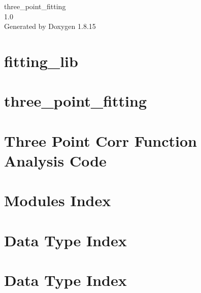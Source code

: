\let\mypdfximage\pdfximage\def\pdfximage{\immediate\mypdfximage}\documentclass[twoside]{book}
\newcommand{\+}{\discretionary{\mbox{\scriptsize$\hookleftarrow$}}{}{}}
\newcommand{\clearemptydoublepage}{%
  \newpage{\pagestyle{empty}\cleardoublepage}%
}
\begin{document}
\hypersetup{pageanchor=false,
             bookmarksnumbered=true,
             pdfencoding=unicode
            }
\begin{titlepage}
\vspace*{7cm}
\begin{center}%
{\Large three\+\_\+point\+\_\+fitting \\[1ex]\large 1.\+0 }\\
\vspace*{1cm}
{\large Generated by Doxygen 1.8.15}\\
\end{center}
\end{titlepage}
\clearemptydoublepage
{}
\tableofcontents
\clearemptydoublepage
{}
\hypersetup{pageanchor=true}

\chapter{fitting\+\_\+lib}
\label{md__Users_archanar_three_pt_analysis_fitting_lib_README}

\chapter{three\+\_\+point\+\_\+fitting}
\label{md__Users_archanar_three_pt_analysis_three_point_fitting_README}

\chapter{Three Point Corr Function Analysis Code}
\label{md__Users_archanar_three_pt_analysis_three_pt_fit_README}

\chapter{Modules Index}

\chapter{Data Type Index}

\chapter{Data Type Index}

\end{document}
